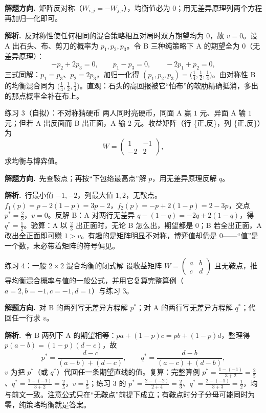 \documentclass[UTF8,a4paper,11pt,oneside,openany,fontset=fandol]{ctexbook}
\theoremstyle{definition}
\newcommand{\sol}{\par\noindent\textbf{解析.}\ }
\newcommand{\hint}{\par\noindent\textbf{解题方向.}\ }
\begin{document}
\hint 矩阵反对称（$W_{i,j}=-W_{j,i}$），均衡值必为 $0$；用无差异原理列两个方程再加归一化即可。

\sol 反对称性使任何相同的混合策略相互对局时双方期望均为 $0$，故 $v=0$。设 A 出石头、布、剪刀的概率为 $p_1,p_2,p_3$。令 B 三种纯策略下 A 的期望全为 $0$（无差异原理）：
\[
 -p_2+2p_3=0,\qquad p_1-p_3=0,\qquad -2p_1+p_2=0,
\]
三式同解：$p_1=p_3$、$p_2=2p_3$，加归一化得 $(p_1,p_2,p_3)=\bigl(\tfrac14,\tfrac12,\tfrac14\bigr)$。由对称性 B 的均衡混合同为 $\bigl(\tfrac14,\tfrac12,\tfrac14\bigr)$。直观：石头的高回报被它“怕布”的软肋精确抵消，多出的那点概率全补在布上。

\begin{problem}{练习 3（自拟）：不对称猜硬币}
两人同时亮硬币，同面 A 赢 $1$ 元、异面 A 输 $1$ 元；但若 A 出反面而 B 出正面，A 输 $2$ 元。收益矩阵（行 \{正,反\}，列 \{正,反\}）为
\[
 W=\begin{pmatrix}1&-1\\-2&2\end{pmatrix},
\]
求均衡与博弈值。
\end{problem}

\hint 先查鞍点；再按“下包络最高点”解 $p$，用无差异原理反解 $q$。

\sol 行最小值 $-1,-2$，列最大值 $1,2$，无鞍点。$f_1(p)=p-2(1-p)=3p-2$，$f_2(p)=-p+2(1-p)=2-3p$，交点 $p^{*}=\tfrac23$，$v=0$。反解 B：A 对两行无差异 $q-(1-q)=-2q+2(1-q)$，得 $q^{*}=\tfrac12$。验算：A 以 $\tfrac23$ 出正面时，无论 B 怎么出，期望都是 $0$；B 若全出正面，A 改出全正面即可赚 $1>v$。有趣的是矩阵明显不对称，博弈值却仍是 $0$——“值”是一个数，未必带着矩阵的符号偏见。

\begin{problem}{练习 4：一般 $2\times2$ 混合均衡的闭式解}
设收益矩阵 $W=\begin{pmatrix}a&b\\ c&d\end{pmatrix}$ 且无鞍点，推导均衡混合概率与值的一般公式，并用它复算完整算例（$a=2,b=-1,c=-1,d=1$）与练习 3。
\end{problem}

\hint 对 B 的两列写无差异方程解 $p^{*}$；对 A 的两行写无差异方程解 $q^{*}$；代回任一行求 $v$。

\sol 令 B 两列下 A 的期望相等：$pa+(1-p)c=pb+(1-p)d$，整理得 $p(a-b)=(1-p)(d-c)$，故
\[
 p^{*}=\frac{d-c}{(a-b)+(d-c)},\qquad
 q^{*}=\frac{d-b}{(a-c)+(d-b)},
\]
$v$ 为把 $p^{*}$（或 $q^{*}$）代回任一条期望直线的值。复算：完整算例 $p^{*}=\tfrac{1-(-1)}{3+2}=\tfrac25$、$q^{*}=\tfrac{1-(-1)}{3+2}=\tfrac25$，$v=\tfrac15$；练习 3 的 $p^{*}=\tfrac{2-(-2)}{2+4}=\tfrac23$、$q^{*}=\tfrac{2-(-1)}{3+3}=\tfrac12$，均与前文一致。注意公式只在“无鞍点”前提下成立；有鞍点时分子分母可能同时为零，纯策略均衡就是答案。
\end{document}
